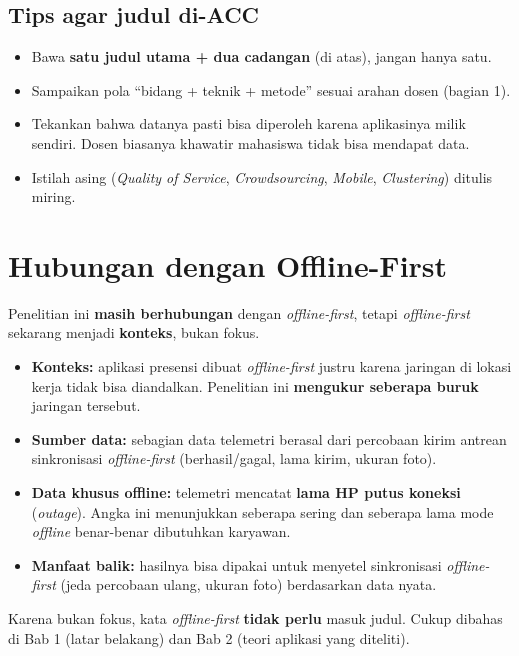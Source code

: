 \documentclass[11pt,a4paper]{article}
\begin{document}
\subsection{Tips agar judul di-ACC}
\begin{itemize}
\item Bawa \textbf{satu judul utama + dua cadangan} (di atas), jangan hanya satu.
\item Sampaikan pola ``bidang + teknik + metode'' sesuai arahan dosen (bagian 1).
\item Tekankan bahwa datanya pasti bisa diperoleh karena aplikasinya milik sendiri. Dosen biasanya khawatir mahasiswa tidak bisa mendapat data.
\item Istilah asing (\textit{Quality of Service}, \textit{Crowdsourcing}, \textit{Mobile}, \textit{Clustering}) ditulis miring.
\end{itemize}

\section{Hubungan dengan Offline-First}
Penelitian ini \textbf{masih berhubungan} dengan \textit{offline-first}, tetapi \textit{offline-first} sekarang menjadi \textbf{konteks}, bukan fokus.
\begin{itemize}
\item \textbf{Konteks:} aplikasi presensi dibuat \textit{offline-first} justru karena jaringan di lokasi kerja tidak bisa diandalkan. Penelitian ini \textbf{mengukur seberapa buruk} jaringan tersebut.
\item \textbf{Sumber data:} sebagian data telemetri berasal dari percobaan kirim antrean sinkronisasi \textit{offline-first} (berhasil/gagal, lama kirim, ukuran foto).
\item \textbf{Data khusus offline:} telemetri mencatat \textbf{lama HP putus koneksi} (\textit{outage}). Angka ini menunjukkan seberapa sering dan seberapa lama mode \textit{offline} benar-benar dibutuhkan karyawan.
\item \textbf{Manfaat balik:} hasilnya bisa dipakai untuk menyetel sinkronisasi \textit{offline-first} (jeda percobaan ulang, ukuran foto) berdasarkan data nyata.
\end{itemize}
Karena bukan fokus, kata \textit{offline-first} \textbf{tidak perlu} masuk judul. Cukup dibahas di Bab 1 (latar belakang) dan Bab 2 (teori aplikasi yang diteliti).

\end{document}
